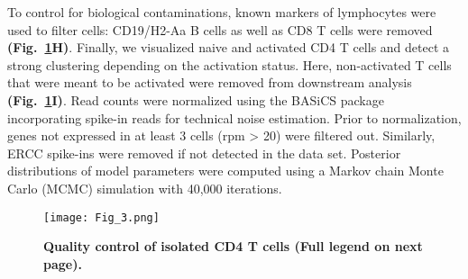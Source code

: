 To control for biological contaminations, known markers of lymphocytes were used to filter cells: CD19\plus{}/H2-Aa\plus{} B cells as well as CD8\plus{} T cells were removed \textbf{(Fig.~\ref{fig1:QC}H)}. Finally, we visualized naive and activated CD4\plus{} T cells and detect a strong clustering depending on the activation status. Here, non-activated T cells that were meant to be activated were removed from downstream analysis \textbf{(Fig.~\ref{fig1:QC}I)}. Read counts were normalized using the BASiCS package \citep{Vallejos2015} incorporating spike-in reads for technical noise estimation. Prior to normalization, genes not expressed in at least 3 cells (rpm > 20) were filtered out. Similarly, ERCC spike-ins were removed if not detected in the data set. Posterior distributions of model parameters were computed using a Markov chain Monte Carlo (MCMC) simulation with 40,000 iterations.   

\newpage

\begin{figure}[!hb]
\centering
\texttt{[image: Fig\_3.png]}
\caption[Quality control of isolated CD4\plus{} T cells]{\textbf{Quality control of isolated CD4\plus{} T cells (Full legend on next page).}\\}
\label{fig1:QC}
\end{figure}

\newpage

